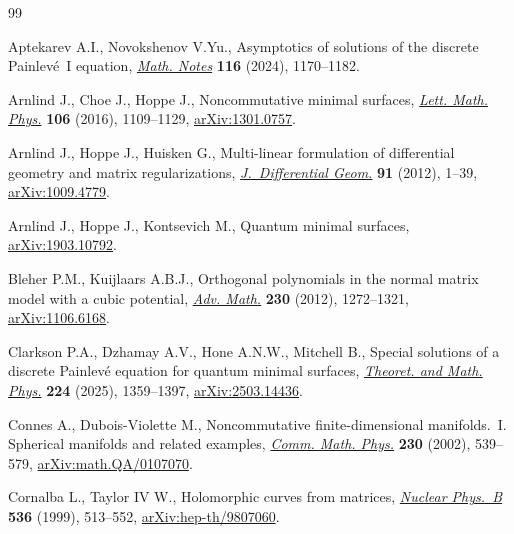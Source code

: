 \documentclass[10pt,a4paper]{amsart}
\numberwithin{equation}{section}
\theoremstyle{definition}
\begin{document}
\begin{thebibliography}{99}
\footnotesize\itemsep=0pt

Aptekarev A.I., Novokshenov V.Yu., Asymptotics of solutions of the discrete
 {P}ainlev\'e~{I} equation,
 \href{https://doi.org/10.4213/mzm14491}{\textit{Math. Notes}} \textbf{116}
 (2024), 1170--1182.

Arnlind J., Choe J., Hoppe J., Noncommutative minimal surfaces,
 \href{https://doi.org/10.1007/s11005-016-0861-7}{\textit{Lett. Math. Phys.}}
 \textbf{106} (2016), 1109--1129,
 \href{http://arxiv.org/abs/1301.0757}{arXiv:1301.0757}.

Arnlind J., Hoppe J., Huisken G., Multi-linear formulation of differential
 geometry and matrix regularizations,
 \href{https://doi.org/10.4310/jdg/1343133699}{\textit{J.~Differential Geom.}}
 \textbf{91} (2012), 1--39,
 \href{http://arxiv.org/abs/1009.4779}{arXiv:1009.4779}.

Arnlind J., Hoppe J., Kontsevich M., Quantum minimal surfaces,
 \href{http://arxiv.org/abs/1903.10792}{arXiv:1903.10792}.

Bleher P.M., Kuijlaars A.B.J., Orthogonal polynomials in the normal matrix
 model with a cubic potential,
 \href{https://doi.org/10.1016/j.aim.2012.03.021}{\textit{Adv. Math.}}
 \textbf{230} (2012), 1272--1321,
 \href{http://arxiv.org/abs/1106.6168}{arXiv:1106.6168}.

Clarkson P.A., Dzhamay A.V., Hone A.N.W., Mitchell B., Special solutions of a
 discrete {P}ainlev\'e equation for quantum minimal surfaces,
 \href{https://doi.org/10.1134/S0040577925080045}{\textit{Theoret. and Math.
 Phys.}} \textbf{224} (2025), 1359--1397,
 \href{http://arxiv.org/abs/2503.14436}{arXiv:2503.14436}.

Connes A., Dubois-Violette M., Noncommutative finite-dimensional
 manifolds.~{I}. {S}pherical manifolds and related examples,
 \href{https://doi.org/10.1007/s00220-002-0715-2}{\textit{Comm. Math. Phys.}}
 \textbf{230} (2002), 539--579,
 \href{http://arxiv.org/abs/math.QA/0107070}{arXiv:math.QA/0107070}.

Cornalba L., Taylor IV W., Holomorphic curves from matrices,
 \href{https://doi.org/10.1016/S0550-3213(98)00702-0}{\textit{Nuclear
 Phys.~B}} \textbf{536} (1999), 513--552,
 \href{http://arxiv.org/abs/hep-th/9807060}{arXiv:hep-th/9807060}.


\end{thebibliography}
\end{document}
